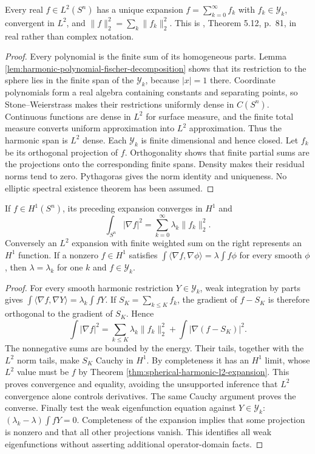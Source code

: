 \begin{theorem}\label{thm:spherical-harmonic-l2-expansion}
Every real $f\in L^2(S^n)$ has a unique expansion $f=\sum_{k=0}^\infty f_k$ with $f_k\in\mathcal Y_k$, convergent in $L^2$, and $\|f\|_2^2=\sum_k\|f_k\|_2^2$. This is \cite{ABR01}, Theorem 5.12, p.~81, in real rather than complex notation.
\end{theorem}
\begin{proof}
Every polynomial is the finite sum of its homogeneous parts. Lemma \ref{lem:harmonic-polynomial-fischer-decomposition} shows that its restriction to the sphere lies in the finite span of the $\mathcal Y_k$, because $|x|=1$ there. Coordinate polynomials form a real algebra containing constants and separating points, so Stone--Weierstrass makes their restrictions uniformly dense in $C(S^n)$. Continuous functions are dense in $L^2$ for surface measure, and the finite total measure converts uniform approximation into $L^2$ approximation. Thus the harmonic span is $L^2$ dense. Each $\mathcal Y_k$ is finite dimensional and hence closed. Let $f_k$ be its orthogonal projection of $f$. Orthogonality shows that finite partial sums are the projections onto the corresponding finite spans. Density makes their residual norms tend to zero. Pythagoras gives the norm identity and uniqueness. No elliptic spectral existence theorem has been assumed.
\end{proof}

\begin{proposition}\label{prop:spherical-harmonic-h1-expansion}
If $f\in H^1(S^n)$, its preceding expansion converges in $H^1$ and
\[
 \int_{S^n}|\nabla f|^2=\sum_{k=0}^\infty\lambda_k\|f_k\|_2^2.
\]
Conversely an $L^2$ expansion with finite weighted sum on the right represents an $H^1$ function. If a nonzero $f\in H^1$ satisfies $\int\langle\nabla f,\nabla\phi\rangle=\lambda\int f\phi$ for every smooth $\phi$, then $\lambda=\lambda_k$ for one $k$ and $f\in\mathcal Y_k$.
\end{proposition}
\begin{proof}
For every smooth harmonic restriction $Y\in\mathcal Y_k$, weak integration by parts gives $\int\langle\nabla f,\nabla Y\rangle=\lambda_k\int fY$. If $S_K=\sum_{k\leq K}f_k$, the gradient of $f-S_K$ is therefore orthogonal to the gradient of $S_K$. Hence
\[
 \int|\nabla f|^2=\sum_{k\leq K}\lambda_k\|f_k\|_2^2+\int|\nabla(f-S_K)|^2.
\]
The nonnegative sums are bounded by the energy. Their tails, together with the $L^2$ norm tails, make $S_K$ Cauchy in $H^1$. By completeness it has an $H^1$ limit, whose $L^2$ value must be $f$ by Theorem \ref{thm:spherical-harmonic-l2-expansion}. This proves convergence and equality, avoiding the unsupported inference that $L^2$ convergence alone controls derivatives. The same Cauchy argument proves the converse. Finally test the weak eigenfunction equation against $Y\in\mathcal Y_k$: $(\lambda_k-\lambda)\int fY=0$. Completeness of the expansion implies that some projection is nonzero and that all other projections vanish. This identifies all weak eigenfunctions without asserting additional operator-domain facts.
\end{proof}

